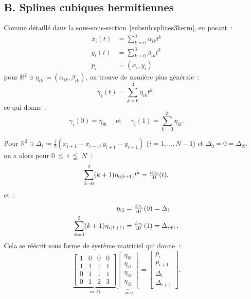 \documentclass[10pt,journal,compsoc]{IEEEtran}
\newcommand{\R}{\mathbb R}
\begin{document}
  \subsection*{B. Splines cubiques hermitiennes}
    Comme détaillé dans la sous-sous-section~\ref{subsub:splines3herm}, en posant~:
	\begin{align}
		x_i(t) &= \sum_{k=0}^3\alpha_{ik}t^k \\
		y_i(t) &= \sum_{k=0}^3\beta_{ik}t^k \\
		p_i &= (x_i, y_i)
	\end{align}
	pour $\R^2 \ni \eta_{ik} \coloneqq (\alpha_{ik}, \beta_{ik})$, on trouve de manière plus générale~:
	\begin{equation}
	  \gamma_i(t) = \sum_{k=0}^3\eta_{ik}t^k,
	\end{equation}
	ce qui donne~:
	\begin{equation}
	  \gamma_i(0) = \eta_{i0} \quad \text{ et } \quad \gamma_i(1) = \sum_{k=0}^3\eta_{ik}.
	\end{equation}

	Pour $\R^2 \ni \Delta_i \coloneqq \frac 12(x_{i+1}-x_{i-1}, y_{i+1}-y_{i-1})$ ($i = 1, \ldots, N-1$) et $\Delta_0 = 0 = \Delta_N$,
	on a alors pour $0~\leq~i~\lneqq~N$~:
	\begin{equation}
	  \sum_{k=0}^2(k+1)\eta_{i(k+1)}t^k = \od {\gamma_i}t(t),
	\end{equation}
	et~:
	\begin{align}
	  \eta_{i1} &= \od {\gamma_i}t(0) = \Delta_i \\
	  \sum_{k=0}^2(k+1)\eta_{i(k+1)} &= \od {\gamma_i}t(1) = \Delta_{i+1}.
	\end{align}
	Cela se réécrit sous forme de système matriciel qui donne~:
	\begin{equation}
	  \underbrace {\begin{bmatrix}
	    1 & 0 & 0 & 0 \\
		1 & 1 & 1 & 1 \\
		0 & 1 & 1 & 1 \\
		0 & 1 & 2 & 3
	  \end{bmatrix}}_{\coloneqq M}
	  \underbrace {\begin{bmatrix}
	    \eta_{i0} \\ \eta_{i1} \\ \eta_{i2} \\ \eta_{i3}
	  \end{bmatrix}}_{\coloneqq \eta}
	  =
	  \begin{bmatrix}
	  p_i \\ p_{i+1} \\ \Delta_i \\ \Delta_{i+1}
	  \end{bmatrix}.
	\end{equation}
\end{document}

